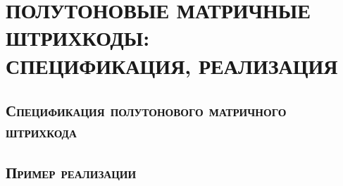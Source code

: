 \section{ПОЛУТОНОВЫЕ МАТРИЧНЫЕ ШТРИХКОДЫ: \\
СПЕЦИФИКАЦИЯ, РЕАЛИЗАЦИЯ}

\subsection{\textsc{Спецификация полутонового матричного 
штрихкода}}

\subsection{\textsc{Пример реализации}}